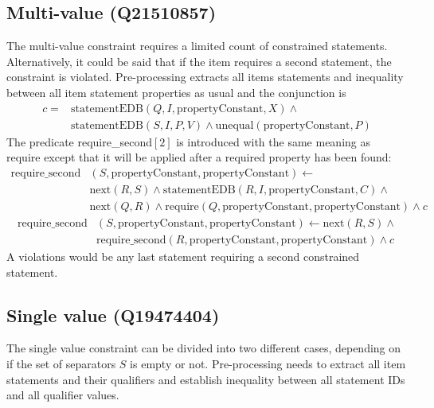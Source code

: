 \documentclass[hyperref,bachelorofscience,fleqn]{cgvpub}
\begin{document}
\subsection{Multi-value (Q21510857)}
The multi-value constraint requires a limited count of constrained statements. Alternatively, it could be said that if the item requires a second statement, the constraint is violated. Pre-processing extracts all items statements and inequality between all item statement properties as usual and the conjunction is 
\begin{equation*}
\begin{split}
c = &\text{statementEDB}(Q, I, \text{propertyConstant}, X) \wedge{} \\
&\text{statementEDB}(S, I, P, V) \wedge \text{unequal}(\text{propertyConstant}, P)
\end{split}
\end{equation*}
The predicate require\_second\([2]\) is introduced with the same meaning as require except that it will be applied after a required property has been found:
\begin{equation*}
\begin{split}
\text{require\_second}&(S, \text{propertyConstant}, \text{propertyConstant}) \leftarrow \\
&\text{next}(R, S) \wedge \text{statementEDB}(R, I, \text{propertyConstant}, C) \wedge{} \\
&\text{next}(Q, R) \wedge \text{require}(Q, \text{propertyConstant}, \text{propertyConstant})  \wedge c
\end{split}
\end{equation*}
\begin{equation*}
\begin{split}
\text{require\_second}&(S, \text{propertyConstant}, \text{propertyConstant}) \leftarrow \text{next}(R, S) \wedge{} \\
&\text{require\_second}(R, \text{propertyConstant}, \text{propertyConstant}) \wedge c
\end{split}
\end{equation*}
A violations would be any last statement requiring a second constrained statement.\\

\subsection{Single value (Q19474404)}\label{subsec_3_single_value}
The single value constraint can be divided into two different cases, depending on if the set of separators \(S\) is empty or not. Pre-processing needs to extract all item statements and their qualifiers and establish inequality between all statement IDs and all qualifier values.
\end{document}
